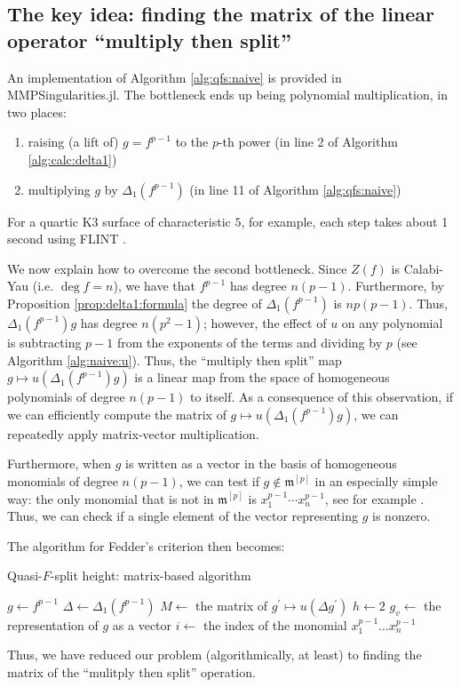 \subsection{The key idea: finding the matrix of the linear operator ``multiply then split''}

An implementation of Algorithm \ref{alg:qfs:naive}
is provided in MMPSingularities.jl.
The bottleneck ends up being polynomial multiplication, 
in two places:
\begin{enumerate}[(1)]
    \item raising (a lift of) \(g = f^{p-1}\) to the \(p\)-th power 
        (in line 2 of Algorithm \ref{alg:calc:delta1})
    \item multiplying \(g\) by \(\Delta_{1}(f^{p-1})\) 
        (in line 11 of Algorithm \ref{alg:qfs:naive})
\end{enumerate}

\noindent For a quartic K3 surface of characteristic \(5\),
for example, each step takes about 1 second 
using FLINT \cite{flint-2023-flint}. 

We now explain how to overcome the second
bottleneck. Since \(Z(f)\) is Calabi-Yau
(i.e. \(\deg f = n\)), we have that \(f^{p-1}\) has degree
\(n(p-1)\). 
Furthermore, by Proposition \ref{prop:delta1:formula}
the degree of \(\Delta_{1}(f^{p-1})\) 
is \(np(p - 1)\).
Thus, \(\Delta_{1}(f^{p-1})g\) has degree
\(n(p^{2} - 1)\); however, the effect 
of \(u\) on any polynomial is subtracting \(p-1\)
from the exponents of the terms and dividing by \(p\) 
(see Algorithm \ref{alg:naive:u}).
Thus, the ``multiply then split'' map 
\(g \mapsto u(\Delta_{1}(f^{p-1}) g)\) 
is a linear map from 
the space of homogeneous polynomials of degree \(n(p-1)\) 
to itself.
As a consequence of this observation,
if we can efficiently compute the matrix of 
\(g \mapsto u(\Delta_{1}(f^{p-1})g)\),
we can repeatedly apply matrix-vector multiplication.

Furthermore, when \(g\) is written as a vector 
in the basis of homogeneous monomials of degree
\(n(p-1)\), we can test if \(g \notin \mathfrak{m}^{[p]}\) 
in an especially simple way: the only 
monomial that is not in \(\mathfrak{m}^{[p]}\) is
\(x_{1}^{p-1}\cdots x_{n}^{p-1}\), 
see for example \cite{kty-2022-fedder}.
Thus, we can check if a single element of the vector representing
\(g\) is nonzero.

The algorithm for Fedder's criterion then becomes:

\begin{algorithm}[H]
\caption{Quasi-\(F\)-split height: matrix-based algorithm}
\label{alg:qfs:matrix}
$g \gets f^{p - 1}$\;
$\Delta \gets \Delta_1(f^{p - 1})$\;
$M \gets $ the matrix of $g^{\prime} \mapsto u(\Delta g^{\prime})$\;
$h \gets 2$\;
$g_v \gets $ the representation of $g$ as a vector\;
$i \gets $ the index of the monomial $x_{1}^{p - 1} \dots x_{n}^{p - 1}$\;
\end{algorithm}

Thus, we have reduced our problem (algorithmically, at least)
to finding the matrix of the ``mulitply then split'' operation.
